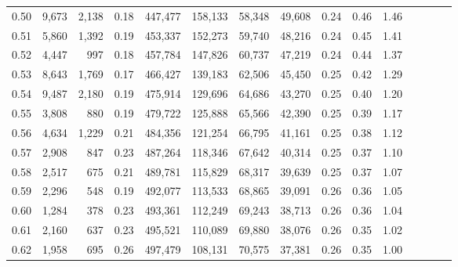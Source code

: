 \begin{tabular}{rrrcrrrrrrrrrrr}
0.50 &   9,673 &  2,138 &                                       0.18 &  447,477 &  158,133 &   58,348 &   49,608 &  0.24 &  0.46 &                         1.46 \\
0.51 &   5,860 &  1,392 &                                       0.19 &  453,337 &  152,273 &   59,740 &   48,216 &  0.24 &  0.45 &                         1.41 \\
0.52 &   4,447 &    997 &                                       0.18 &  457,784 &  147,826 &   60,737 &   47,219 &  0.24 &  0.44 &                         1.37 \\
0.53 &   8,643 &  1,769 &                                       0.17 &  466,427 &  139,183 &   62,506 &   45,450 &  0.25 &  0.42 &                         1.29 \\
0.54 &   9,487 &  2,180 &                                       0.19 &  475,914 &  129,696 &   64,686 &   43,270 &  0.25 &  0.40 &                         1.20 \\
0.55 &   3,808 &    880 &                                       0.19 &  479,722 &  125,888 &   65,566 &   42,390 &  0.25 &  0.39 &                         1.17 \\
0.56 &   4,634 &  1,229 &                                       0.21 &  484,356 &  121,254 &   66,795 &   41,161 &  0.25 &  0.38 &                         1.12 \\
0.57 &   2,908 &    847 &                                       0.23 &  487,264 &  118,346 &   67,642 &   40,314 &  0.25 &  0.37 &                         1.10 \\
0.58 &   2,517 &    675 &                                       0.21 &  489,781 &  115,829 &   68,317 &   39,639 &  0.25 &  0.37 &                         1.07 \\
0.59 &   2,296 &    548 &                                       0.19 &  492,077 &  113,533 &   68,865 &   39,091 &  0.26 &  0.36 &                         1.05 \\
0.60 &   1,284 &    378 &                                       0.23 &  493,361 &  112,249 &   69,243 &   38,713 &  0.26 &  0.36 &                         1.04 \\
0.61 &   2,160 &    637 &                                       0.23 &  495,521 &  110,089 &   69,880 &   38,076 &  0.26 &  0.35 &                         1.02 \\
0.62 &   1,958 &    695 &                                       0.26 &  497,479 &  108,131 &   70,575 &   37,381 &  0.26 &  0.35 &                         1.00 \\

\end{tabular}
